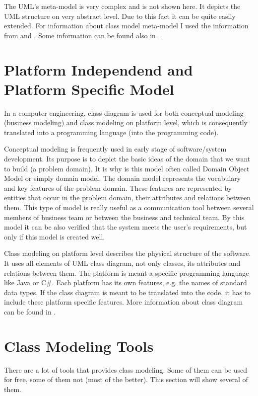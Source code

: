 The UML's meta-model is very complex and is not shown here. It depicts the UML structure on very abstract level. Due to this fact it can be quite easily extended. For information about class model meta-model I used the information from \cite{UMLDistilled} and \cite{ArlowUML}. Some information can be found also in \cite{UMLWeb}.

\section{Platform Independend and Platform Specific Model}
\label{ClassDiagramDiagramTypes}

In a computer engineering, class diagram is used for both conceptual modeling (business modeling) and class modeling on platform level, which is consequently translated into a programming language (into the programming code).

Conceptual modeling is frequently used in early stage of software/system development. Its purpose is to depict the basic ideas of the domain that we want to build (a problem domain). It is why is this model often called Domain Object Model or simply domain model. The domain model represents the vocabulary and key features of the problem domain. These features are represented by entities that occur in the problem domain, their attributes and relations between them. This type of model is really useful as a communication tool between several members of business team or between the business and technical team. By this model it can be also verified that the system meets the user's requirements, but only if this model is created well.

Class modeling on platform level describes the physical structure of the software. It uses all elements of UML class diagram, not only classes, its attributes and relations between them. The platform is meant a specific programming language like Java or C\#. Each platform has its own features, e.g. the names of standard data types. If the class diagram is meant to be translated into the code, it has to include these platform specific features. More information about class diagram can be found in \cite{UMLDistilled}.

\section{Class Modeling Tools}

There are a lot of tools that provides class modeling. Some of them can be used for free, some of them not (most of the better). This section will show several of them.

